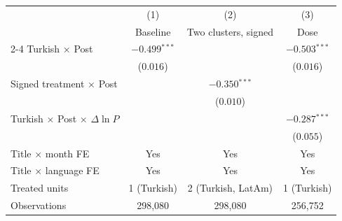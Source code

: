 \begin{tabular}{lccc}
\toprule
 & (1) & (2) & (3) \\
 & Baseline & Two clusters, signed & Dose \\
\cmidrule(lr){2-4}
Turkish $\times$ Post & $-0.499$$^{***}$ &  & $-0.503$$^{***}$ \\
 & ($0.016$) &  & ($0.016$) \\[3pt]
Signed treatment $\times$ Post &  & $-0.350$$^{***}$ &  \\
 &  & ($0.010$) &  \\[3pt]
Turkish $\times$ Post $\times$ $\Delta\ln P$ &  &  & $-0.287$$^{***}$ \\
 &  &  & ($0.055$) \\[3pt]
\midrule
Title $\times$ month FE & Yes & Yes & Yes \\
Title $\times$ language FE & Yes & Yes & Yes \\
Treated units & 1 (Turkish) & 2 (Turkish, LatAm) & 1 (Turkish) \\
Observations & 298,080 & 298,080 & 256,752 \\
\bottomrule
\end{tabular}

